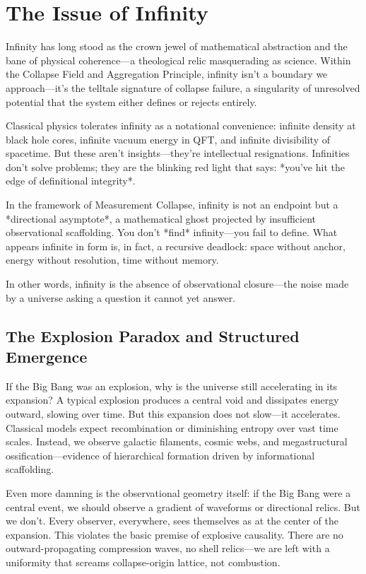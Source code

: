 \chapter{The Issue of Infinity}
\renewcommand{\thesection}{11.\arabic{section}}

Infinity has long stood as the crown jewel of mathematical abstraction and the bane of physical coherence—a theological relic masquerading as science. Within the Collapse Field and Aggregation Principle, infinity isn't a boundary we approach—it's the telltale signature of collapse failure, a singularity of unresolved potential that the system either defines or rejects entirely\cite{penrose1996gravity, carroll2001cosmos}.

Classical physics tolerates infinity as a notational convenience: infinite density at black hole cores, infinite vacuum energy in QFT, and infinite divisibility of spacetime. But these aren’t insights—they're intellectual resignations. Infinities don’t solve problems; they are the blinking red light that says: *you’ve hit the edge of definitional integrity*\cite{ellis_infinities_physics}.

In the framework of Measurement Collapse, infinity is not an endpoint but a *directional asymptote*, a mathematical ghost projected by insufficient observational scaffolding. You don’t *find* infinity—you fail to define. What appears infinite in form is, in fact, a recursive deadlock: space without anchor, energy without resolution, time without memory.

In other words, infinity is the absence of observational closure—the noise made by a universe asking a question it cannot yet answer.

\section{The Explosion Paradox and Structured Emergence}

If the Big Bang was an explosion, why is the universe still accelerating in its expansion? A typical explosion produces a central void and dissipates energy outward, slowing over time. But this expansion does not slow—it accelerates\cite{peacock2000cosmological}. Classical models expect recombination or diminishing entropy over vast time scales. Instead, we observe galactic filaments, cosmic webs, and megastructural ossification—evidence of hierarchical formation driven by informational scaffolding.

Even more damning is the observational geometry itself: if the Big Bang were a central event, we should observe a gradient of waveforms or directional relics. But we don’t. Every observer, everywhere, sees themselves as at the center of the expansion. This violates the basic premise of explosive causality. There are no outward-propagating compression waves, no shell relics—we are left with a uniformity that screams collapse-origin lattice, not combustion. 

